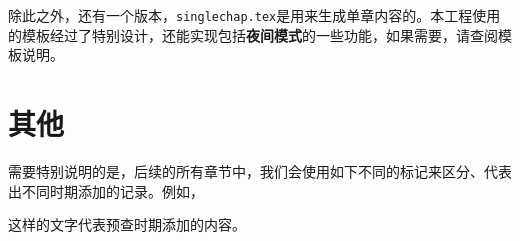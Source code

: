 \documentclass[Chinese,inNight]{CKBib}
\begin{document}
除此之外，还有一个版本，\texttt{singlechap.tex}是用来生成单章内容的。本工程使用的模板经过了特别设计，还能实现包括\textbf{夜间模式}的一些功能，如果需要，请查阅模板说明。

\section*{其他}

需要特别说明的是，后续的所有章节中，我们会使用如下不同的标记来区分、代表出不同时期添加的记录。例如，


这样的文字代表预查时期添加的内容。



\cleardoublepage

\end{document}
